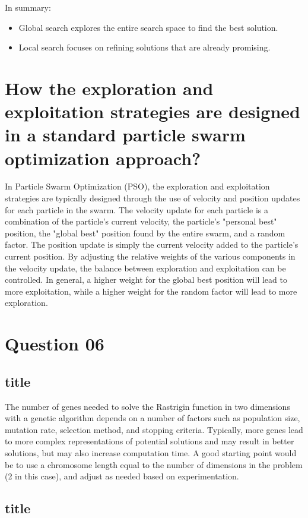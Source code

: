 \documentclass[conference]{IEEEtran}
\begin{document}
In summary:
\begin{itemize}
	\item Global search explores the entire search space to find the best solution.
	\item Local search focuses on refining solutions that are already promising.
\end{itemize}


\section{How the exploration and exploitation strategies are designed in a standard particle swarm optimization approach?}

In Particle Swarm Optimization (PSO), the exploration and exploitation strategies are typically designed through the use of velocity and position updates for each particle in the swarm. The velocity update for each particle is a combination of the particle's current velocity, the particle's "personal best" position, the "global best" position found by the entire swarm, and a random factor. The position update is simply the current velocity added to the particle's current position. By adjusting the relative weights of the various components in the velocity update, the balance between exploration and exploitation can be controlled. In general, a higher weight for the global best position will lead to more exploitation, while a higher weight for the random factor will lead to more exploration.

\section{Question 06}

\subsection{title}

The number of genes needed to solve the Rastrigin function in two dimensions with a genetic algorithm depends on a number of factors such as population size, mutation rate, selection method, and stopping criteria. Typically, more genes lead to more complex representations of potential solutions and may result in better solutions, but may also increase computation time. A good starting point would be to use a chromosome length equal to the number of dimensions in the problem (2 in this case), and adjust as needed based on experimentation.

\subsection{title}
\end{document}
